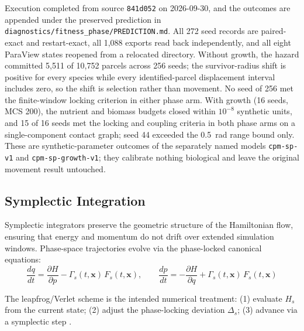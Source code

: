 \documentclass[11pt]{article}
\begin{document}
Execution completed from source \texttt{841d052} on 2026-09-30, and the outcomes are appended
under the preserved prediction in \texttt{diagnostics/fitness\_phase/PREDICTION.md}. All 272
seed records are paired-exact and restart-exact, all 1,088 exports read back independently, and
all eight ParaView states reopened from a relocated directory. Without growth, the hazard
committed 5,511 of 10,752 parcels across 256 seeds; the survivor-radius shift is positive for
every species while every identified-parcel displacement interval includes zero, so the shift is
selection rather than movement. No seed of 256 met the finite-window locking criterion in
either phase arm. With growth (16 seeds, MCS 200), the nutrient and biomass budgets closed
within $10^{-8}$ synthetic units, and 15 of 16 seeds met the locking and coupling criteria in
both phase arms on a single-component contact graph; seed 44 exceeded the 0.5~rad range bound
only. These are synthetic-parameter outcomes of the separately named models
\texttt{cpm-sp-v1} and \texttt{cpm-sp-growth-v1}; they calibrate nothing biological and leave
the original movement result untouched.

\subsection{Symplectic Integration}
\label{app:symplectic}

Symplectic integrators preserve the geometric structure of the Hamiltonian flow, ensuring that
energy and momentum do not drift over extended simulation windows. Phase-space trajectories
evolve via the phase-locked canonical equations:
\begin{equation}
\label{eq:canonical}
\frac{dq}{dt} = \frac{\partial H}{\partial p} - \Gamma_s(t,\mathbf{x})\,F_s(t,\mathbf{x}),
\qquad
\frac{dp}{dt} = -\frac{\partial H}{\partial q} + \Gamma_s(t,\mathbf{x})\,F_s(t,\mathbf{x})
\end{equation}

The leapfrog/Verlet scheme is the intended numerical treatment: (1) evaluate $H_s$ from the
current state; (2) adjust the phase-locking deviation $\Delta_s$; (3) advance via a symplectic step
\cite{hairer2006}.
\end{document}
